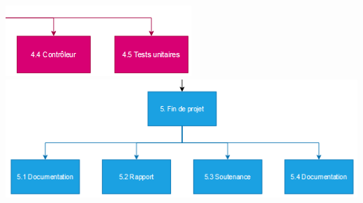 \documentclass{article}
\begin{document}
\includegraphics[scale=0.75]{11.png} \\ 
\includegraphics[scale=0.75]{12.png} \\
\end{document}

